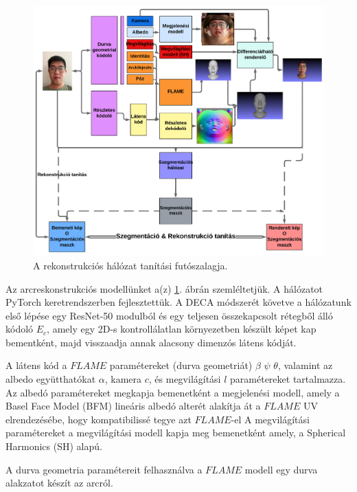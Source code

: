 \documentclass[12pt,a4]{article}
\begin{document}
            \begin{figure}[h]	
        		\centering
        		\includegraphics[width=1\linewidth]{pipelinehun}
        		\caption{  A rekonstrukciós hálózat tanítási futószalagja.}
                \label{fig:pipeline}
        	\end{figure}
         
        	Az arcreskonstrukciós modellünket a(z) \ref{fig:pipeline}. ábrán szemléltetjük. A hálózatot PyTorch
        	keretrendszerben fejlesztettük.
        	A DECA módszerét követve a hálózatunk első lépése egy
        	ResNet-50 modulból és egy teljesen összekapcsolt rétegből álló kódoló
        	$E_{c}$, amely egy 2D-s kontrollálatlan környezetben készült képet kap bementként, majd visszaadja annak alacsony dimenzós látens kódját.
         
            A látens kód a $FLAME$
        	paramétereket (durva geometriát) $\beta$ $\psi$ $\theta$, valamint az albedo együtthatókat
        	$\alpha$, kamera $c$, és megvilágítási $l$ paramétereket tartalmazza.
        	Az albedó paramétereket megkapja
        	bemenetként a megjelenési modell, amely a Basel Face Model (BFM)
        	lineáris albedó alterét alakítja át a $FLAME$ UV elrendezésébe,
        	hogy kompatibilissé tegye azt $FLAME$-el A megvilágítási paramétereket
        	a megvilágítási modell kapja meg bemenetként amely,
        	a Spherical Harmonics (SH) alapú.
         
            A durva geometria
        	paramétereit felhasználva a $FLAME$ modell egy durva alakzatot készít az
        	arcról. 
 
\end{document}
